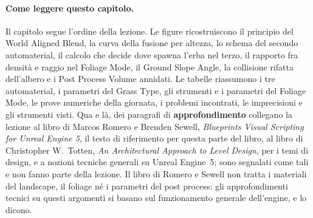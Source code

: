 \paragraph{Come leggere questo capitolo.} Il capitolo segue l'ordine della lezione. Le
figure ricostruiscono il principio del World Aligned Blend, la curva della fusione per
altezza, lo schema del secondo automaterial, il calcolo che decide dove spawna l'erba nel
terzo, il rapporto fra densità e raggio nel Foliage Mode, il Ground Slope Angle, la
collisione rifatta dell'albero e i Post Process Volume annidati. Le tabelle riassumono i
tre automaterial, i parametri del Grass Type, gli strumenti e i parametri del Foliage
Mode, le prove numeriche della giornata, i problemi incontrati, le imprecisioni e gli
strumenti visti. Qua e là, dei paragrafi di \textbf{approfondimento} collegano la lezione
al libro di Marcos Romero e Brenden Sewell, \emph{Blueprints Visual Scripting for Unreal
Engine 5}, il testo di riferimento per questa parte del libro, al libro di Christopher W.\
Totten, \emph{An Architectural Approach to Level Design}, per i temi di design, e a nozioni
tecniche generali su Unreal Engine~5; sono segnalati come tali e non fanno parte della
lezione. Il libro di Romero e Sewell non tratta i materiali del landscape, il foliage né i
parametri del post process: gli approfondimenti tecnici su questi argomenti si basano sul
funzionamento generale dell'engine, e lo dicono.


